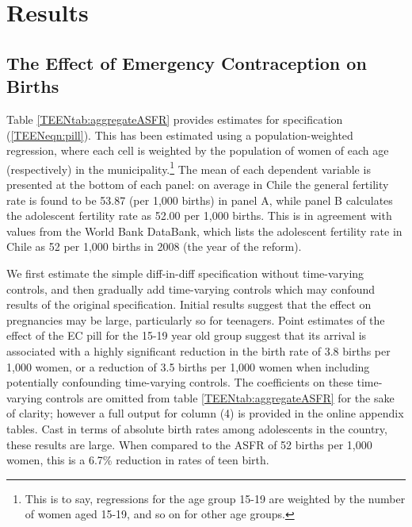 \section{Results}
\label{TEENscn:results}
\subsection{The Effect of Emergency Contraception on Births}
\label{TEENsscn:rbirths}
Table \ref{TEENtab:aggregateASFR} provides estimates for specification 
(\ref{TEENeqn:pill}).  This has been estimated using a population-weighted 
regression, where each cell is weighted by the population of women of each age
(respectively) in the municipality.\footnote{This is to say, regressions for
the age group 15-19 are weighted by the number of women aged 15-19, and so on
for other age groups.} The mean of each dependent variable is presented at the 
bottom of each panel: on average in Chile the general fertility rate is found
to be 53.87 (per 1,000 births) in panel A, while panel B calculates the 
adolescent fertility rate as 52.00 per 1,000 births.  This is in agreement
with values from the World Bank DataBank, which lists the adolescent fertility
rate in Chile as 52 per 1,000 births in 2008 (the year of the reform).

We first estimate the simple diff-in-diff specification without time-varying 
controls, and then gradually add time-varying controls which may confound results 
of the original specification.  Initial results suggest that the effect on 
pregnancies may be large, particularly so for teenagers.  Point estimates of the
effect of the EC pill for the 15-19 year old group suggest that its arrival is 
associated with a highly significant reduction in the birth rate of 3.8 births 
per 1,000 women, or a reduction of 3.5 births per 1,000 women when including 
potentially confounding time-varying controls.  The coefficients on these 
time-varying controls are omitted from table \ref{TEENtab:aggregateASFR} for the
sake of clarity; however a full output for column (4) is provided in the online
appendix tables.  Cast in terms of absolute birth rates among adolescents in the
country, these results are large.  When compared to the ASFR of 52 births per
1,000 women, this is a 6.7\% reduction in rates of teen birth.

